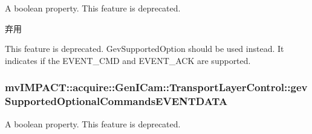 A boolean property. This feature is deprecated. 

\begin{DoxyRefDesc}{弃用}
\item[\hyperlink{deprecated__deprecated000073}{弃用}]This feature is deprecated. Gev\+Supported\+Option should be used instead. It indicates if the E\+V\+E\+N\+T\+\_\+\+C\+M\+D and E\+V\+E\+N\+T\+\_\+\+A\+C\+K are supported. \end{DoxyRefDesc}
\hypertarget{classmv_i_m_p_a_c_t_1_1acquire_1_1_gen_i_cam_1_1_transport_layer_control_ae4f0b33c477d2fcb26fc0aebc24a0b40}{
\subsubsection[{gev\+Supported\+Optional\+Commands\+E\+V\+E\+N\+T\+D\+A\+T\+A}]{ mv\+I\+M\+P\+A\+C\+T\+::acquire\+::\+Gen\+I\+Cam\+::\+Transport\+Layer\+Control\+::gev\+Supported\+Optional\+Commands\+E\+V\+E\+N\+T\+D\+A\+T\+A}}\label{classmv_i_m_p_a_c_t_1_1acquire_1_1_gen_i_cam_1_1_transport_layer_control_ae4f0b33c477d2fcb26fc0aebc24a0b40}


A boolean property. This feature is deprecated. 

